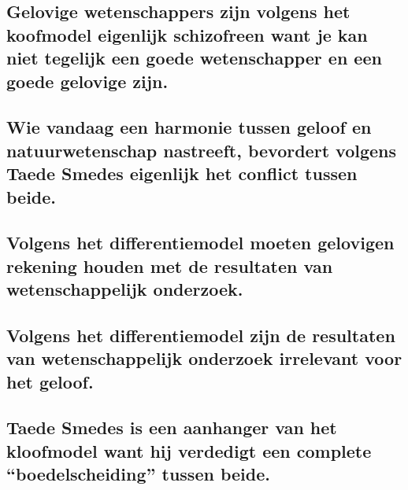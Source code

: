 \documentclass[main.tex]{subfiles}
\begin{document}
\subsection{Gelovige wetenschappers zijn volgens het koofmodel eigenlijk schizofreen want je kan niet tegelijk een goede wetenschapper en een goede gelovige zijn.}
\subsection{Wie vandaag een harmonie tussen geloof en natuurwetenschap nastreeft, bevordert volgens Taede Smedes eigenlijk het conflict tussen beide.}
\subsection{Volgens het differentiemodel moeten gelovigen rekening houden met de resultaten van wetenschappelijk onderzoek.}
\subsection{Volgens het differentiemodel zijn de resultaten van wetenschappelijk onderzoek irrelevant voor het geloof.}
\subsection{Taede Smedes is een aanhanger van het kloofmodel want hij verdedigt een complete “boedelscheiding” tussen beide.}
\end{document}

